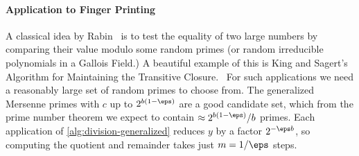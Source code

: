 \paragraph{Application to Finger Printing}
 A classical idea by Rabin~\cite{rabin1981fingerprinting} is to test the equality of two large numbers by comparing their value modulo some random primes (or random irreducible polynomials in a Gallois Field.)
 A beautiful example of this is King and Sagert's Algorithm for Maintaining the Transitive Closure.~\cite{DBLP:journals/jcss/KingS02}
 For such applications
 we need a reasonably large set of random primes to choose from.
 The generalized Mersenne primes with $c$ up to $2^{b(1-\eps)}$ are a good candidate set, which from the prime number theorem we expect to contain $\approx 2^{b(1-\eps)}/b$ primes.
 Each application of \cref{alg:division-generalized} reduces $y$ by a factor $2^{-\eps b}$,
 so computing the quotient and remainder takes just $m=1/\eps$ steps.





